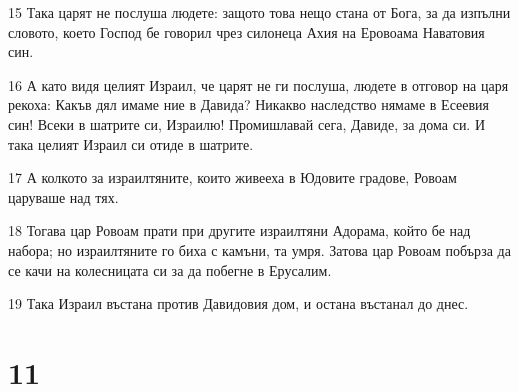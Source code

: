 \par 15 Така царят не послуша людете: защото това нещо стана от Бога, за да изпълни словото, което Господ бе говорил чрез силонеца Ахия на Еровоама Наватовия син.
\par 16 А като видя целият Израил, че царят не ги послуша, людете в отговор на царя рекоха: Какъв дял имаме ние в Давида? Никакво наследство нямаме в Есеевия син! Всеки в шатрите си, Израилю! Промишлавай сега, Давиде, за дома си. И така целият Израил си отиде в шатрите.
\par 17 А колкото за израилтяните, които живееха в Юдовите градове, Ровоам царуваше над тях.
\par 18 Тогава цар Ровоам прати при другите израилтяни Адорама, който бе над набора; но израилтяните го биха с камъни, та умря. Затова цар Ровоам побърза да се качи на колесницата си за да побегне в Ерусалим.
\par 19 Така Израил въстана против Давидовия дом, и остана въстанал до днес.

\chapter{11}

